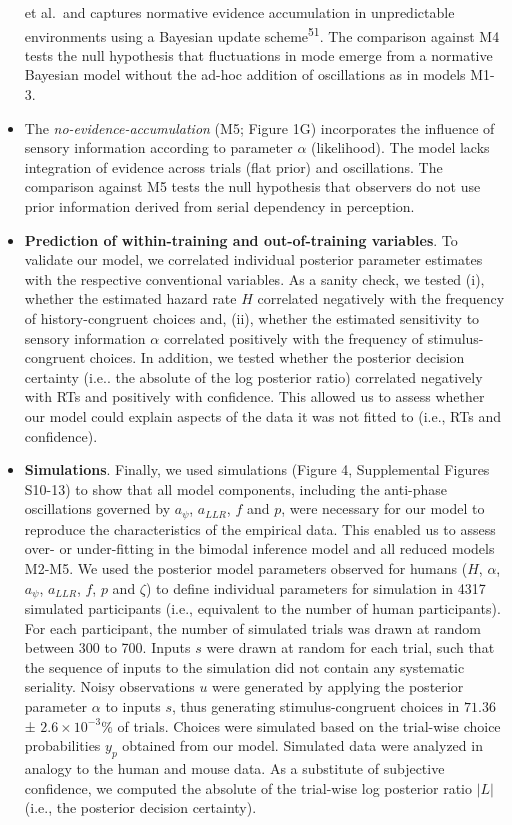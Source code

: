 \documentclass[
]{article}
\begin{document}
\begin{itemize}
  et al.~and captures normative evidence accumulation in unpredictable
  environments using a Bayesian update scheme\textsuperscript{51}. The
  comparison against M4 tests the null hypothesis that fluctuations in
  mode emerge from a normative Bayesian model without the ad-hoc
  addition of oscillations as in models M1-3.
\item
  The \emph{no-evidence-accumulation} (M5; Figure 1G) incorporates the
  influence of sensory information according to parameter \(\alpha\)
  (likelihood). The model lacks integration of evidence across trials
  (flat prior) and oscillations. The comparison against M5 tests the
  null hypothesis that observers do not use prior information derived
  from serial dependency in perception.
\item
  \textbf{Prediction of within-training and out-of-training variables}.
  To validate our model, we correlated individual posterior parameter
  estimates with the respective conventional variables. As a sanity
  check, we tested (i), whether the estimated hazard rate \(H\)
  correlated negatively with the frequency of history-congruent choices
  and, (ii), whether the estimated sensitivity to sensory information
  \(\alpha\) correlated positively with the frequency of
  stimulus-congruent choices. In addition, we tested whether the
  posterior decision certainty (i.e.. the absolute of the log posterior
  ratio) correlated negatively with RTs and positively with confidence.
  This allowed us to assess whether our model could explain aspects of
  the data it was not fitted to (i.e., RTs and confidence).
\item
  \textbf{Simulations}. Finally, we used simulations (Figure 4,
  Supplemental Figures S10-13) to show that all model components,
  including the anti-phase oscillations governed by \(a_{\psi}\),
  \(a_{LLR}\), \(f\) and \(p\), were necessary for our model to
  reproduce the characteristics of the empirical data. This enabled us
  to assess over- or under-fitting in the bimodal inference model and
  all reduced models M2-M5. We used the posterior model parameters
  observed for humans (\(H\), \(\alpha\), \(a_{\psi}\), \(a_{LLR}\),
  \(f\), \(p\) and \(\zeta\)) to define individual parameters for
  simulation in 4317 simulated participants (i.e., equivalent to the
  number of human participants). For each participant, the number of
  simulated trials was drawn at random between 300 to 700. Inputs \(s\)
  were drawn at random for each trial, such that the sequence of inputs
  to the simulation did not contain any systematic seriality. Noisy
  observations \(u\) were generated by applying the posterior parameter
  \(\alpha\) to inputs \(s\), thus generating stimulus-congruent choices
  in \(71.36\) ± \(\ensuremath{2.6\times 10^{-3}}\)\% of trials. Choices
  were simulated based on the trial-wise choice probabilities \(y_{p}\)
  obtained from our model. Simulated data were analyzed in analogy to
  the human and mouse data. As a substitute of subjective confidence, we
  computed the absolute of the trial-wise log posterior ratio \(|L|\)
  (i.e., the posterior decision certainty).
\end{itemize}
\end{document}
